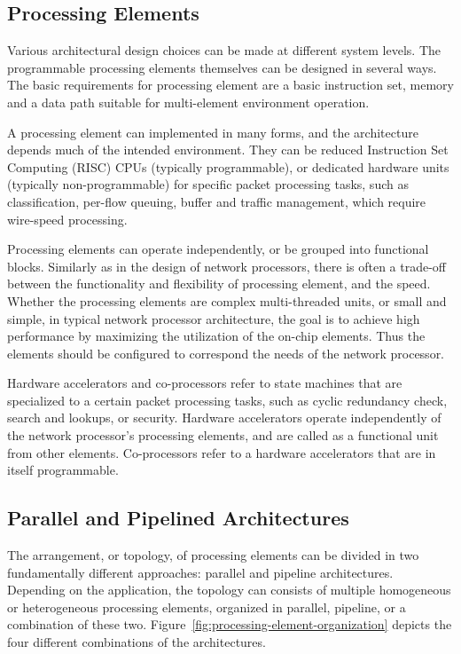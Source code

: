 \subsection{Processing Elements}
Various architectural design choices can be made at different system levels. The programmable processing elements themselves can be designed in several ways. The basic requirements for processing element are a basic instruction set, memory and a data path suitable for multi-element environment operation.~\cite{Giladi:2008:Network}

A processing element can implemented in many forms, and the architecture depends much of the intended environment. They can be reduced Instruction Set Computing (RISC) CPUs (typically programmable), or dedicated hardware units (typically non-programmable) for specific packet processing tasks, such as classification, per-flow queuing, buffer and traffic management, which require wire-speed processing.~\cite{Giladi:2008:Network}

Processing elements can operate independently, or be grouped into functional blocks. Similarly as in the design of network processors, there is often a trade-off between the functionality and flexibility of processing element, and the speed. Whether the processing elements are complex multi-threaded units, or small and simple, in typical network processor architecture, the goal is to achieve high performance by maximizing the utilization of the on-chip elements. Thus the elements should be configured to correspond the needs of the network processor.~\cite{Giladi:2008:Network}

Hardware accelerators and co-processors refer to state machines that are specialized to a certain packet processing tasks, such as cyclic redundancy check, search and lookups, or security. Hardware accelerators operate independently of the network processor's processing elements, and are called as a functional unit from other elements. Co-processors refer to a hardware accelerators that are in itself programmable.~\cite{Giladi:2008:Network}

\subsection{Parallel and Pipelined Architectures}
The arrangement, or topology, of processing elements can be divided in two fundamentally different approaches: parallel and pipeline architectures. Depending on the application, the topology can consists of multiple homogeneous or heterogeneous processing elements, organized in parallel, pipeline, or a combination of these two. Figure~\ref{fig:processing-element-organization} depicts the four different combinations of the architectures.~\cite{Giladi:2008:Network}

